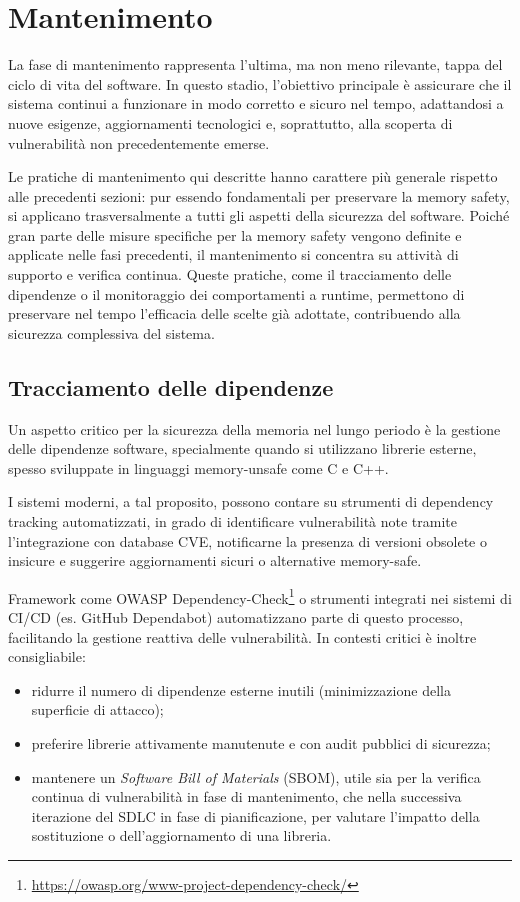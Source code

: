 \section{Mantenimento}
\label{sec:maintenance}

La fase di mantenimento rappresenta l'ultima, ma non meno rilevante, tappa del ciclo
di vita del software. In questo stadio, l'obiettivo principale è assicurare che il
sistema continui a funzionare in modo corretto e sicuro nel tempo, adattandosi a
nuove esigenze, aggiornamenti tecnologici e, soprattutto, alla scoperta di vulnerabilità
non precedentemente emerse.

Le pratiche di mantenimento qui descritte hanno carattere più generale rispetto alle
precedenti sezioni: pur essendo fondamentali per preservare la memory safety, si
applicano trasversalmente a tutti gli aspetti della sicurezza del software.
Poiché gran parte delle misure specifiche per la memory safety vengono definite
e applicate nelle fasi precedenti, il mantenimento si concentra su attività di supporto
e verifica continua. Queste pratiche, come il tracciamento delle dipendenze o il
monitoraggio dei comportamenti a runtime, permettono di preservare nel tempo l'efficacia
delle scelte già adottate, contribuendo alla sicurezza complessiva del sistema.

\subsection{Tracciamento delle dipendenze}
\label{sec:tracciamento-dipendenze}

Un aspetto critico per la sicurezza della memoria nel lungo periodo è la
gestione delle dipendenze software, specialmente quando si utilizzano librerie esterne,
spesso sviluppate in linguaggi memory-unsafe come C e C++.

I sistemi moderni, a tal proposito, possono contare su strumenti di dependency
tracking automatizzati, in grado di identificare vulnerabilità note tramite l'integrazione
con database CVE, notificarne la presenza di versioni obsolete o insicure e
suggerire aggiornamenti sicuri o alternative memory-safe.

Framework come OWASP Dependency-Check\footnote{\url{https://owasp.org/www-project-dependency-check/}}
o strumenti integrati nei sistemi di CI/CD (es. GitHub Dependabot) automatizzano
parte di questo processo, facilitando la gestione reattiva delle vulnerabilità.
In contesti critici è inoltre consigliabile:
\begin{itemize}
  \item ridurre il numero di dipendenze esterne inutili (minimizzazione della
    superficie di attacco);

  \item preferire librerie attivamente manutenute e con audit pubblici di sicurezza;

  \item mantenere un \textit{Software Bill of Materials} (SBOM), utile sia per la
    verifica continua di vulnerabilità in fase di mantenimento, che nella
    successiva iterazione del SDLC in fase di pianificazione, per valutare l'impatto
    della sostituzione o dell'aggiornamento di una libreria.
\end{itemize}

